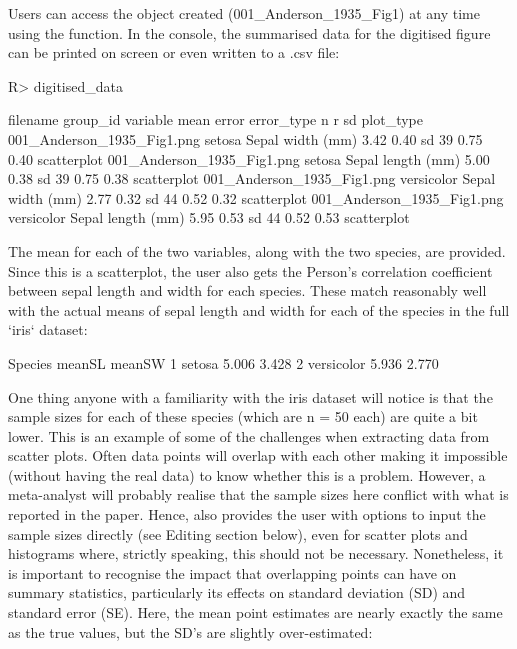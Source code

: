 \documentclass[article]{jss}
\newcommand{\fct}[1]{\code{#1()}}
\begin{document}
Users can access the  object created (001\_Anderson\_1935\_Fig1) at any time using the \fct{metaDigitse} function. In the  console, the summarised data for the digitised figure can be printed on screen or even written to a .csv file:

\begin{CodeChunk}
\begin{CodeInput}
R> digitised_data
\end{CodeInput}
{\scriptsize
\begin{CodeOutput}
                  filename    group_id         variable  mean  error error_type  n     r    sd  plot_type
001_Anderson_1935_Fig1.png      setosa  Sepal width (mm)  3.42  0.40  sd        39  0.75  0.40  scatterplot
001_Anderson_1935_Fig1.png      setosa  Sepal length (mm) 5.00  0.38  sd        39  0.75  0.38  scatterplot
001_Anderson_1935_Fig1.png  versicolor  Sepal width (mm)  2.77  0.32  sd        44  0.52  0.32  scatterplot
001_Anderson_1935_Fig1.png  versicolor  Sepal length (mm) 5.95  0.53  sd        44  0.52  0.53  scatterplot
\end{CodeOutput}
}
\end{CodeChunk}

The mean for each of the two variables, along with the two species, are provided. Since this is a scatterplot, the user also gets the Person's correlation coefficient between sepal length and width for each species. These match reasonably well with the actual means of sepal length and width for each of the species in the full `iris` dataset:

\begin{CodeChunk}
\begin{CodeOutput}
     Species meanSL meanSW
1     setosa  5.006  3.428
2 versicolor  5.936  2.770
\end{CodeOutput}
\end{CodeChunk}

One thing anyone with a familiarity with the iris dataset will notice is that the sample sizes for each of these species (which are n = 50 each) are quite a bit lower. This is an example of some of the challenges when extracting data from scatter plots. Often data points will overlap with each other making it impossible (without having the real data) to know whether this is a problem. However, a meta-analyst will probably realise that the sample sizes here conflict with what is reported in the paper. Hence,  also provides the user with  options to input the sample sizes directly (see Editing section below), even for scatter plots and histograms where, strictly speaking, this should not be necessary. Nonetheless, it is important to recognise the impact that overlapping points can have on summary statistics, particularly its effects on standard deviation (SD) and standard error (SE). Here, the mean point estimates are nearly exactly the same as the true values, but the SD's are slightly over-estimated:
\end{document}
